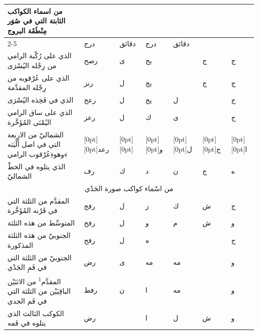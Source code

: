 \documentclass[11pt]{article}
\newcommand{\AbjadZero}{{\NallinoSigns\symbol{"E000}}}
\begin{document}
\begin{Arabic}\begin{tabular}{|p{84mm}|>{\centering\arraybackslash}p{9mm}|>{\centering\arraybackslash}p{9mm}|>{\centering\arraybackslash}p{9mm}|>{\centering\arraybackslash}p{9mm}|>{\centering\arraybackslash}p{14mm}|>{\centering\arraybackslash}p{17mm}|}\hline
\multirow{2}{*}{\parbox{80mm}{\centering من اسماء الكواكب الثابتة التي في صُوَر مِنْطَقَة البروج}} & \multicolumn{2}{c|}{الطول} & \multicolumn{2}{c|}{العرض} & \multirow{2}{*}{\parbox{13mm}{\centering\small علامات الجهة}} & \multirow{2}{*}{\parbox{16mm}{\centering\small مراتب العظمة}} \\ \cline{2-5}
 & {\small درج} & {\small دقائق} & {\small درج} & {\small دقائق} & & \\ \hline
الذي على رُكْبة الرامي من رِجْله اليُسْرَى & رصح & ى & يح & \AbjadZero{} & ج & ج \\
الذي على عُرْقوبه من رِجْله المقدَّمة & رنز & ل & يج & \AbjadZero{} & ج & ج \\
الذي في فَخِذه اليُسْرَى & رعح & ل & يج & ل &  & ج \\
الذي على ساق الرامي اليُمْنَى المُؤَخَّرة & رعز & ل & ك & ى &  & ج \\
الشماليّ من الاربعة التي في اصل أَلْيَته وهو\newline ﴿عُرْقوب الرامي﴾ & \raisebox{-1\normalbaselineskip}[0pt][0pt]{رعد} & \raisebox{-1\normalbaselineskip}[0pt][0pt]{\AbjadZero{}} & \raisebox{-1\normalbaselineskip}[0pt][0pt]{و} & \raisebox{-1\normalbaselineskip}[0pt][0pt]{ل} & \raisebox{-1\normalbaselineskip}[0pt][0pt]{ج} & \raisebox{-1\normalbaselineskip}[0pt][0pt]{ا} \\
الذي يتلوه في الخطّ الشماليّ & رف & ك & د & ن & ج & ه \\
\hline
\multicolumn{7}{|c|}{\large من اسْماء كواكب صورة الجَدْي} \\ \hline
المقدَّم من الثلثة التي في قَرْنه المُؤَخَّرة & رفح & ل & ز & ك & ش & ج \\
المتوسِّط من هذه الثلثة & رفح & ل & و & م & ش & و \\
الجنوبيّ من هذه الثلثة المذكورة & رفح & ل & ه & \AbjadZero{} &  & ج \\
الجنوبيّ من الثلثة التي في فَمِ الجَدْي & رض & ى & مه & مه &  & و \\
المقدَّم\textsuperscript{1} من الاثنَيْن الباقِيَيْن من الثلثة التي في فَم الجدي & رفط & ن & ا & مه &  & و \\
الكوكب الثالث الذي يتلوه في فَمه & رض & \AbjadZero{} & ا & ل & ش & و \\

\end{tabular}
\end{Arabic}
\end{document}
